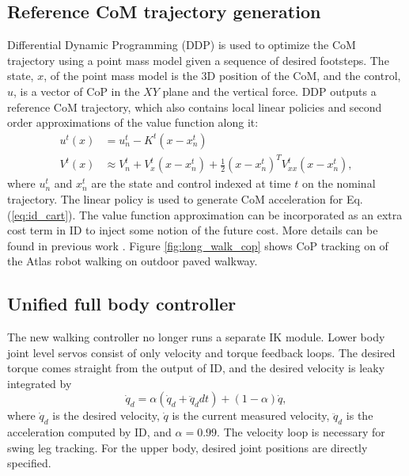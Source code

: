 \documentclass{ws-ijhr}
\newcommand{\eref}[1] {Eq. (\ref{#1})}
\newcommand{\fref}[1] {Figure \ref{#1}}
\begin{document}
\subsection{Reference CoM trajectory generation}
Differential Dynamic Programming (DDP) \cite{ddp} is used to optimize the CoM
trajectory using a point mass model given a sequence of desired footsteps. 
The state, $x$, of the point mass model is the 3D position of the CoM,
and the control, $u$, is a vector of CoP in the $XY$ plane and the vertical 
force. 
DDP outputs a reference CoM trajectory, which also contains local linear 
policies and second order approximations of the value function along it:
\begin{equation}
	\begin{split}
	  u^t(x) &= u^t_n - K^t(x-x^t_n) \\
		V^t(x) &\approx V^t_n + V^t_x (x-x^t_n) + \frac{1}{2}(x-x^t_n)^TV^t_{xx}(x-x^t_n),
	\end{split}
	\label{eq:ddp_res}
\end{equation} 
where $u^t_n$ and $x^t_n$ are the  state and control indexed at time $t$ on
the nominal trajectory. 
The linear policy is used to generate CoM acceleration for \eref{eq:id_cart}.
The value function approximation can be incorporated as an extra cost term 
in ID to inject some notion of the future cost. More details can be found 
in previous work \cite{sfeng_online,sfeng_proposal}.
\fref{fig:long_walk_cop} shows CoP tracking on of the Atlas robot walking on
outdoor paved walkway. 

\subsection{Unified full body controller}
The new walking controller no longer runs a separate IK module. 
Lower body joint level servos consist of only velocity and torque feedback 
loops. 
The desired torque comes straight from the output of ID, and the desired 
velocity is leaky integrated by
\begin{equation}
  \dot{q}_d = \alpha (\dot{q}_d + \ddot{q}_d dt) + (1-\alpha) \dot{q},
	\label{eq:qd_int}
\end{equation} 
where $\dot{q}_d$ is the desired velocity, $\dot{q}$ is the current 
measured velocity, $\ddot{q}_d$ is the acceleration computed by ID, and $\alpha = 0.99$. 
The velocity loop is necessary for swing leg tracking. 
For the upper body, desired joint positions are directly specified.
\end{document}
